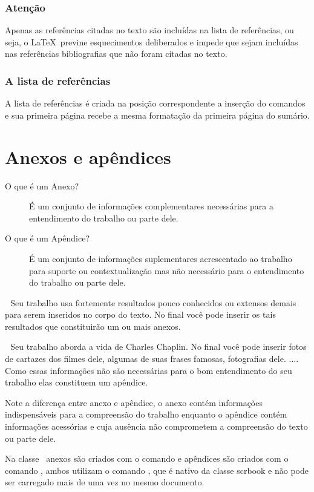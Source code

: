 \subsubsection{Atenção}
Apenas as referências citadas no texto são incluídas na
lista de referências, ou seja, o \LaTeX\ previne esquecimentos
deliberados e impede que sejam incluídas nas referências
bibliografias que não foram citadas no texto.


\subsubsection{A lista de referências}

A lista de referências é criada na posição correspondente a inserção do comandos  e sua primeira página recebe a mesma formatação da primeira página do sumário.

\section{Anexos e apêndices}
\begin{description}
\item[O que é um Anexo?]
	É um conjunto de informações complementares necessárias
    para a entendimento do trabalho ou parte dele.	
\item[O que é um Apêndice?]
	É um conjunto de informações suplementares acrescentado
    ao trabalho para suporte ou contextualização mas não
    necessário para o entendimento do trabalho ou parte dele.
\end{description}

\exemplo\,\, Seu trabalho usa fortemente resultados pouco conhecidos
ou extensos demais para serem inseridos no corpo do texto. No
final você pode inserir os tais resultados que constituirão um ou mais anexos.

\exemplo\,\, Seu trabalho aborda a vida de Charles Chaplin. No final você
pode inserir fotos de cartazes dos filmes dele, algumas de suas
frases famosas, fotografias dele. $\ldots$. Como essas informações
não são necessárias para o bom entendimento do seu trabalho elas
constituem um apêndice.

Note a diferença entre anexo e apêndice, o anexo contém informações
indispensáveis para a compreensão do trabalho enquanto o apêndice
contém informações acessórias e cuja ausência não comprometem a
compreensão do texto ou parte dele.

Na classe \estilo\ anexos são criados com o comando  e apêndices
são criados com o comando , ambos utilizam o comando
, que é nativo da classe scrbook e não pode ser
carregado mais de uma vez no mesmo documento.

